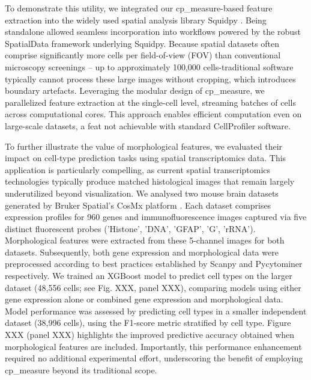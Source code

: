 \documentclass{article}
\begin{document}
To demonstrate this utility, we integrated our cp\_measure-based feature extraction into the widely used spatial analysis library Squidpy \citep{pallaSquidpyScalableFramework2022}. Being standalone allowed seamless incorporation into workflows powered by the robust SpatialData \citep{marconatoSpatialDataOpenUniversal2025} framework underlying Squidpy. Because spatial datasets often comprise significantly more cells per field-of-view (FOV) than conventional microscopy screenings -- up to approximately 100,000 cells-traditional software typically cannot process these large images without cropping, which introduces boundary artefacts. Leveraging the modular design of cp\_measure, we parallelized feature extraction at the single-cell level, streaming batches of cells across computational cores. This approach enables efficient computation even on large-scale datasets, a feat not achievable with standard CellProfiler software.

To further illustrate the value of morphological features, we evaluated their impact on cell-type prediction tasks using spatial transcriptomics data. This application is particularly compelling, as current spatial transcriptomics technologies typically produce matched histological images that remain largely underutilized beyond visualization. We analysed two mouse brain datasets generated by Bruker Spatial's CosMx platform \citep{CosMxSMIMouse2025}. Each dataset comprises expression profiles for 960 genes and immunofluorescence images captured via five distinct fluorescent probes ('Histone', 'DNA', 'GFAP', 'G', 'rRNA'). Morphological features were extracted from these 5-channel images for both datasets. Subsequently, both gene expression and morphological data were preprocessed according to best practices established by Scanpy \citep{wolfSCANPYLargescaleSinglecell2018} and Pycytominer \citep{serranoReproducibleImagebasedProfiling2025} respectively. We trained an XGBoost model to predict cell types on the larger dataset (48,556 cells; see Fig. XXX, panel XXX), comparing models using either gene expression alone or combined gene expression and morphological data. Model performance was assessed by predicting cell types in a smaller independent dataset (38,996 cells), using the F1-score metric stratified by cell type. Figure XXX (panel XXX) highlights the improved predictive accuracy obtained when morphological features are included. Importantly, this performance enhancement required no additional experimental effort, underscoring the benefit of employing cp\_measure beyond its traditional scope.
\end{document}

